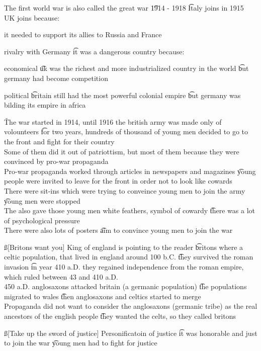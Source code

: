\documentclass[12pt]{article}
\begin{document}
The first world war is also called the great war \t 1914 - 1918 \t Italy joins in 1915 \\
UK joins because:
\bi
\item it needed to support its allies to Russia and France
\item rivalry with Germany \t it was a dangerous country because:
  \bi
    \item economical \t uk was the richest and more industrialized country in the world \t but germany had become competition
    \item political \t britain still had the most powerful colonial empire \t but germany was bilding its empire in africa
  \ei
\ei

\v

The war started in 1914, until 1916 the british army was made only of volounteers \t for two years, hundreds of thousand of young men decided to go to the front and fight for their country \\
Some of them did it out of patriottism, but most of them because they were convinced by pro-war propaganda \\
Pro-war propaganda worked through articles in newspapers and magazines \t young people were invited to leave for the front in order not to look like cowards \\
There were sit-ins which were trying to conveince young men to join the army \t young men were stopped \\
The also gave those young men white feathers, symbol of cowardy \t there was a lot of psychological pressure \\
There were also lots of posters \t aim to convince young men to join the war

\ss[Britons want you]
King of england is pointing to the reader \t britons where a celtic population, that lived in england around 100 b.C. \t they survived the roman invasion \t in year 410 a.D. they regained independence from the roman empire, which ruled between 43 and 410 a.D. \\
450 a.D. anglosaxons attacked britain (a germanic population) \t the populations migrated to wales \t then anglosaxons and celtics started to merge \\
Propaganda did not want to consider the anglosaxons (germanic tribe) as the real ancestors of the english people \t they wanted the celts, so they called britons

\ss[Take up the sword of justice]
Personificatoin of justice \t it was honorable and just to join the war \t young men had to fight for justice
\end{document}
